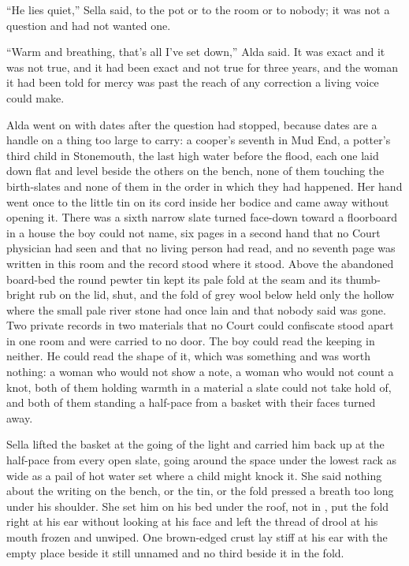 “He lies quiet,” Sella said, to the pot or to the room or to nobody; it was not a question and had not wanted one.

“Warm and breathing, that's all I've set down,” Alda said. It was exact and it was not true, and it had been exact and not true for three years, and the woman it had been told for mercy was past the reach of any correction a living voice could make.

Alda went on with dates after the question had stopped, because dates are a handle on a thing too large to carry: a cooper's seventh in Mud End, a potter's third child in Stonemouth, the last high water before the flood, each one laid down flat and level beside the others on the bench, none of them touching the birth-slates and none of them in the order in which they had happened. Her hand went once to the little tin on its cord inside her bodice and came away without opening it. There was a sixth narrow slate turned face-down toward a floorboard in a house the boy could not name, six pages in a second hand that no Court physician had seen and that no living person had read, and no seventh page was written in this room and the record stood where it stood. Above the abandoned board-bed the round pewter tin kept its pale fold at the seam and its thumb-bright rub on the lid, shut, and the fold of grey wool below held only the hollow where the small pale river stone had once lain and that nobody said was gone. Two private records in two materials that no Court could confiscate stood apart in one room and were carried to no door. The boy could read the keeping in neither. He could read the shape of it, which was something and was worth nothing: a woman who would not show a note, a woman who would not count a knot, both of them holding warmth in a material a slate could not take hold of, and both of them standing a half-pace from a basket with their faces turned away.

\scenebreak

Sella lifted the basket at the going of the light and carried him back up  at the half-pace from every open slate, going around the space under the lowest rack as wide as a pail of hot water set where a child might knock it. She said nothing about the writing on the bench, or the tin, or the fold pressed a breath too long under his shoulder. She set him on his bed under the  roof, not in , put the fold right at his ear without looking at his face and left the thread of drool at his mouth frozen and unwiped. One brown-edged crust lay stiff at his ear with the empty place beside it still unnamed and no third beside it in the fold.

